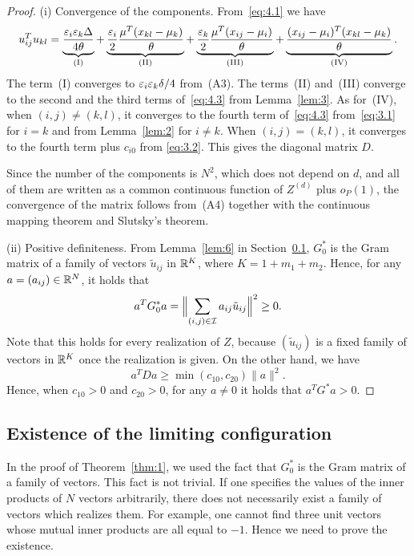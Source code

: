 \begin{proof}
(i) Convergence of the components. From~\eqref{eq:4.1} we have
\[
u_{ij}^Tu_{kl}
=\underbrace{\frac{\varepsilon_i\varepsilon_k\Delta}{4\theta}}_{\mathrm{(I)}}
+\underbrace{\frac{\varepsilon_i}{2}\frac{\mu^T(x_{kl}-\mu_k)}{\theta}}_{\mathrm{(II)}}
+\underbrace{\frac{\varepsilon_k}{2}\frac{\mu^T(x_{ij}-\mu_i)}{\theta}}_{\mathrm{(III)}}
+\underbrace{\frac{(x_{ij}-\mu_i)^T(x_{kl}-\mu_k)}{\theta}}_{\mathrm{(IV)}}.
\]
The term~(I) converges to $\varepsilon_i\varepsilon_k\delta/4$ from~(A3). The terms~(II)
and~(III) converge to the second and the third terms of~\eqref{eq:4.3} from
Lemma~\ref{lem:3}. As for~(IV), when $(i,j)\neq(k,l)$, it converges to the fourth
term of~\eqref{eq:4.3} from~\eqref{eq:3.1} for $i=k$ and from Lemma~\ref{lem:2} for
$i\neq k$. When $(i,j)=(k,l)$, it converges to the fourth term plus $c_{i0}$ from
\eqref{eq:3.2}. This gives the diagonal matrix $D$.

Since the number of the components is $N^2$, which does not depend on $d$, and all
of them are written as a common continuous function of $Z^{(d)}$ plus $o_P(1)$, the
convergence of the matrix follows from~(A4) together with the continuous mapping
theorem and Slutsky's theorem.

(ii) Positive definiteness. From Lemma~\ref{lem:6} in Section~\ref{sec:config-exist},
$G_0^*$ is the Gram matrix of a family of vectors $\tilde u_{ij}$ in $\mathbb{R}^K$, where
$K=1+m_1+m_2$. Hence, for any $a=(a_{ij})\in\mathbb{R}^N$, it holds that
\[
a^TG_0^*a=\Bigl\|\sum_{(i,j)\in\mathcal{I}}a_{ij}\tilde u_{ij}\Bigr\|^2\ge 0.
\]
Note that this holds for every realization of $Z$, because
$(\tilde u_{ij})$ is a fixed family of vectors in $\mathbb{R}^K$ once the realization is
given. On the other hand, we have
\[
a^TDa\ge\min(c_{10},c_{20})\|a\|^2.
\]
Hence, when $c_{10}>0$ and $c_{20}>0$, for any $a\neq 0$ it holds that
$a^TG^*a>0$.
\end{proof}

\subsection{Existence of the limiting configuration}
\label{sec:config-exist}

In the proof of Theorem~\ref{thm:1}, we used the fact that $G_0^*$ is the Gram
matrix of a family of vectors. This fact is not trivial. If one specifies the
values of the inner products of $N$ vectors arbitrarily, there does not necessarily
exist a family of vectors which realizes them. For example, one cannot find three
unit vectors whose mutual inner products are all equal to $-1$. Hence we need to
prove the existence.

